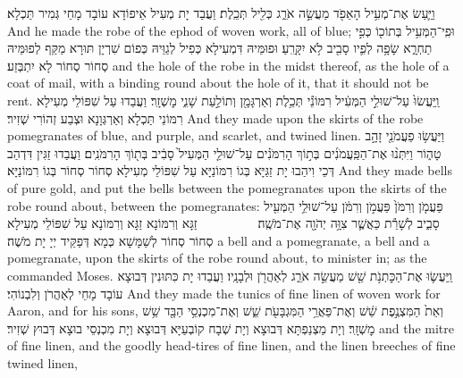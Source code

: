 {וַיַּ֛עַשׂ אֶת־מְעִ֥יל הָאֵפֹ֖ד מַעֲשֵׂ֣ה אֹרֵ֑ג כְּלִ֖יל תְּכֵֽלֶת׃}
{וַעֲבַד יָת מְעִיל אֵיפוֹדָא עוֹבָד מָחֵי גְּמִיר תַּכְלָא׃}
{And he made the robe of the ephod of woven work, all of blue;}{}
{וּפִֽי־הַמְּעִ֥יל בְּתוֹכ֖וֹ כְּפִ֣י תַחְרָ֑א שָׂפָ֥ה לְפִ֛יו סָבִ֖יב לֹ֥א יִקָּרֵֽעַ׃}
{וּפוּמֵּיהּ דִּמְעִילָא כְּפִיל לְגַוֵּיהּ כְּפוֹם שִׁרְיָן תּוּרָא מַקַּף לְפוּמֵּיהּ סְחוֹר סְחוֹר לָא יִתְבְּזַע׃}
{and the hole of the robe in the midst thereof, as the hole of a coat of mail, with a binding round about the hole of it, that it should not be rent.}{}
{וַֽיַּעֲשׂוּ֙ עַל־שׁוּלֵ֣י הַמְּעִ֔יל רִמּוֹנֵ֕י תְּכֵ֥לֶת וְאַרְגָּמָ֖ן וְתוֹלַ֣עַת שָׁנִ֑י מׇשְׁזָֽר׃}
{וַעֲבַדוּ עַל שִׁפּוֹלֵי מְעִילָא רִמּוֹנֵי תַּכְלָא וְאַרְגְּוָנָא וּצְבַע זְהוֹרִי שְׁזִיר׃}
{And they made upon the skirts of the robe pomegranates of blue, and purple, and scarlet, and twined linen.}{}
{וַיַּעֲשׂ֥וּ פַעֲמֹנֵ֖י זָהָ֣ב טָה֑וֹר וַיִּתְּנ֨וּ אֶת־הַפַּֽעֲמֹנִ֜ים בְּת֣וֹךְ הָרִמֹּנִ֗ים עַל־שׁוּלֵ֤י הַמְּעִיל֙ סָבִ֔יב בְּת֖וֹךְ הָרִמֹּנִֽים׃}
{וַעֲבַדוּ זַגִּין דִּדְהַב דְּכֵי וִיהַבוּ יָת זַגַּיָּא בְּגוֹ רִמּוֹנַיָּא עַל שִׁפּוֹלֵי מְעִילָא סְחוֹר סְחוֹר בְּגוֹ רִמּוֹנַיָּא׃}
{And they made bells of pure gold, and put the bells between the pomegranates upon the skirts of the robe round about, between the pomegranates:}{}
{פַּעֲמֹ֤ן וְרִמֹּן֙ פַּעֲמֹ֣ן וְרִמֹּ֔ן עַל־שׁוּלֵ֥י הַמְּעִ֖יל סָבִ֑יב לְשָׁרֵ֕ת כַּאֲשֶׁ֛ר צִוָּ֥ה יְהֹוָ֖ה אֶת־מֹשֶֽׁה׃ \setuma         }
{זַגָּא וְרִמּוֹנָא זַגָּא וְרִמּוֹנָא עַל שִׁפּוֹלֵי מְעִילָא סְחוֹר סְחוֹר לְשַׁמָּשָׁא כְּמָא דְּפַקֵּיד יְיָ יָת מֹשֶׁה׃}
{a bell and a pomegranate, a bell and a pomegranate, upon the skirts of the robe round about, to minister in; as the \lord\space commanded Moses.}{}
{וַֽיַּעֲשׂ֛וּ אֶת־הַכׇּתְנֹ֥ת שֵׁ֖שׁ מַעֲשֵׂ֣ה אֹרֵ֑ג לְאַהֲרֹ֖ן וּלְבָנָֽיו׃}
{וַעֲבַדוּ יָת כִּתּוּנִין דְּבוּצָא עוֹבָד מָחֵי לְאַהֲרֹן וְלִבְנוֹהִי׃}
{And they made the tunics of fine linen of woven work for Aaron, and for his sons,}{}
{וְאֵת֙ הַמִּצְנֶ֣פֶת שֵׁ֔שׁ וְאֶת־פַּאֲרֵ֥י הַמִּגְבָּעֹ֖ת שֵׁ֑שׁ וְאֶת־מִכְנְסֵ֥י הַבָּ֖ד שֵׁ֥שׁ מׇשְׁזָֽר׃
}
{וְיָת מַצְנַפְתָּא דְּבוּצָא וְיָת שְׁבָח קוֹבְעַיָּא דְּבוּצָא וְיָת מִכְנְסֵי בוּצָא דְּבוּץ שְׁזִיר׃}
{and the mitre of fine linen, and the goodly head-tires of fine linen, and the linen breeches of fine twined linen,}{}
